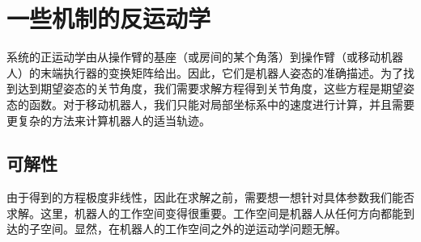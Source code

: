 
\section{一些机制的反运动学}
系统的正运动学由从操作臂的基座（或房间的某个角落）到操作臂（或移动机器人）的末端执行器的变换矩阵给出。因此，它们是机器人姿态的准确描述。为了找到达到期望姿态的关节角度，我们需要求解方程得到关节角度，这些方程是期望姿态的函数。对于移动机器人，我们只能对局部坐标系中的速度进行计算，并且需要更复杂的方法来计算机器人的适当轨迹。


\subsection{可解性}
由于得到的方程极度非线性，因此在求解之前，需要想一想针对具体参数我们能否求解。这里，机器人的工作空间变得很重要。工作空间是机器人从任何方向都能到达的子空间。显然，在机器人的工作空间之外的逆运动学问题无解。


